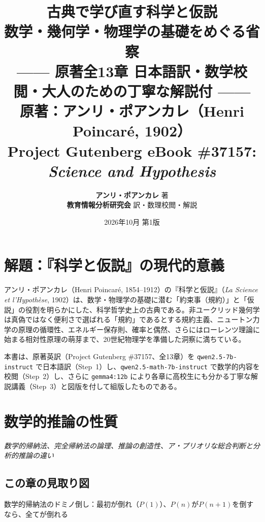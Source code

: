 \documentclass[a4paper,11pt,openany]{ltjsbook}
\title{\Huge\textbf{古典で学び直す科学と仮説}\\[4mm]
\huge\textbf{数学・幾何学・物理学の基礎をめぐる省察}\\[6mm]
\Large\textbf{—— 原著全13章 日本語訳・数学校閲・大人のための丁寧な解説付 ——}\\[5mm]
\large 原著：アンリ・ポアンカレ（Henri Poincar\'e, 1902）\\[2mm]
\normalsize Project Gutenberg eBook \#37157: \textit{Science and Hypothesis}}
\author{\textbf{アンリ・ポアンカレ} 著\\[2mm]\textbf{教育情報分析研究会} 訳・数理校閲・解説}
\date{2026年10月 第1版}
\begin{document}
\maketitle
\frontmatter
\chapter*{解題：『科学と仮説』の現代的意義}

アンリ・ポアンカレ（Henri Poincar\'e, 1854--1912）の『科学と仮説』（\textit{La Science et l'Hypoth\`ese}, 1902）は、数学・物理学の基礎に潜む「約束事（規約）」と「仮説」の役割を明らかにした、科学哲学史上の古典である。非ユークリッド幾何学は真偽ではなく便利さで選ばれる「規約」であるとする規約主義、ニュートン力学の原理の循環性、エネルギー保存則、確率と偶然、さらにはローレンツ理論に始まる相対性原理の萌芽まで、20世紀物理学を準備した洞察に満ちている。

本書は、原著英訳（Project Gutenberg \#37157、全13章）を \texttt{qwen2.5-7b-instruct} で日本語訳（Step~1）し、\texttt{qwen2.5-math-7b-instruct} で数学的内容を校閲（Step~2）し、さらに \texttt{gemma4:12b} により各章に高校生にも分かる丁寧な解説講義（Step~3）と図版を付して組版したものである。

\tableofcontents
\mainmatter
\chapter{数学的推論の性質}
\begin{center}\large\textit{数学的帰納法、完全帰納法の論理、推論の創造性、ア・プリオリな総合判断と分析的推論の違い}\end{center}

\section*{この章の見取り図}
\begin{center}


\small 数学的帰納法のドミノ倒し：最初が倒れ（$P(1)$）、$P(n)$が$P(n+1)$を倒すなら、全てが倒れる
\end{center}
\end{document}
